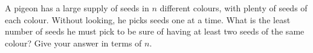 A pigeon has a large supply of seeds in $n$ different colours, with plenty of seeds of each colour. Without looking, he picks seeds one at a time. What is the least number of seeds he must pick to be sure of having at least two seeds of the same colour? Give your answer in terms of $n$.
